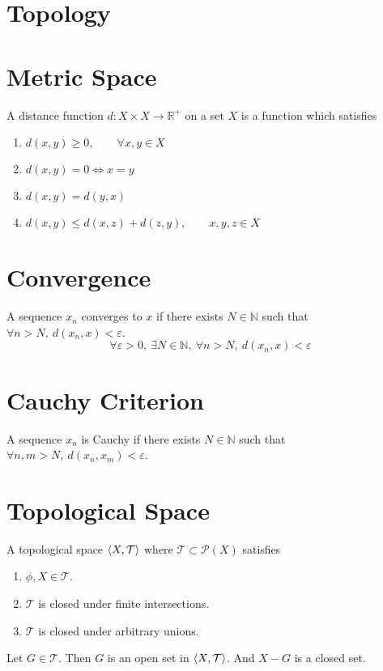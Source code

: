 \section{Topology}
\section{Metric Space}
\begin{definition}
	A distance function $d : X \times X \to \mathbb{R}^+$ on a set $X$ is a function which satisfies
	\begin{enumerate}
		\item $d(x,y) \ge 0,\qquad \forall x,y \in X$
		\item $d(x,y) = 0 \iff x=y$
		\item $d(x,y) = d(y,x)$
		\item $d(x,y) \le d(x,z) + d(z,y), \qquad x,y,z \in X$
	\end{enumerate}
\end{definition}

\section{Convergence}
\begin{definition}[metric]
	A sequence $x_n$ converges to $x$ if there exists $N \in \mathbb{N}$ such that $\forall n > N,\ d(x_n,x) < \varepsilon$.
\begin{equation}
	\forall \varepsilon > 0,\ \exists N \in \mathbb{N},\ \forall n > N,\ d(x_n,x) < \varepsilon
\end{equation}
\end{definition}

\section{Cauchy Criterion}
\begin{definition}[metric]
	A sequence $x_n$ is Cauchy if there exists $N \in \mathbb{N}$ such that $\forall n,m > N,\ d(x_n,x_m) < \varepsilon$.
\end{definition}

\section{Topological Space}
\begin{definition}
	A topological space $\left\langle X,\mathcal{T} \right\rangle$ where $\mathcal{T} \subset \mathcal{P}(X)$ satisfies
	\begin{enumerate}
		\item $\phi,X \in \mathcal{T}$.
		\item $\mathcal{T}$ is closed under finite intersections.
		\item $\mathcal{T}$ is closed under arbitrary unions.
	\end{enumerate}
	Let $G \in \mathcal{T}$.
	Then $G$ is an open set in $\left\langle X,\mathcal{T} \right\rangle$.
	And $X-G$ is a closed set.
\end{definition}

